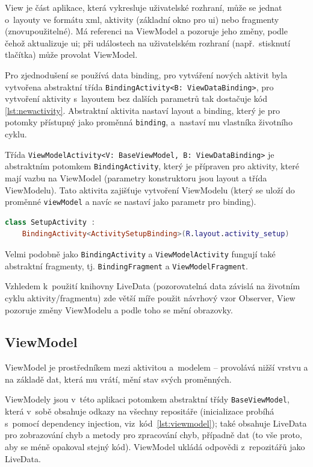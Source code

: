 \documentclass[twoside]{ctuthesis}
\begin{document}
View je část aplikace, která vykresluje uživatelské rozhraní, může se jednat o~layouty ve formátu \acrshort{xml}, aktivity (základní okno pro \acrshort{ui}) nebo fragmenty (znovupoužitelné). Má referenci na ViewModel a pozoruje jeho změny, podle čehož aktualizuje \acrshort{ui}; při událostech na uživatelském rozhraní (např.~stisknutí tlačítka) může provolat ViewModel.

Pro zjednodušení se používá data binding, pro vytváření nových aktivit byla vytvořena abstraktní třída \texttt{BindingActivity<B: ViewDataBinding>}, pro vytvoření aktivity s~layoutem bez dalších parametrů tak dostačuje kód \ref{lst:newactivity}. Abstraktní aktivita nastaví layout a binding, který je pro potomky přístupný jako proměnná \texttt{binding}, a~nastaví mu vlastníka životního cyklu.

Třída \texttt{ViewModelActivity<V: BaseViewModel, B:  ViewDataBinding>} je abstraktním potomkem \texttt{BindingActivity}, který je přípraven pro aktivity, které mají vazbu na ViewModel (parametry konstruktoru jsou layout a třída ViewModelu). Tato aktivita zajišťuje vytvoření ViewModelu (který se uloží do proměnné \texttt{viewModel} a navíc se nastaví jako parametr pro binding).

\begin{lstlisting}[language=Kotlin,caption={Vytvoření jednoduché aktivity},label={lst:newactivity}]
class SetupActivity :
	BindingActivity<ActivitySetupBinding>(R.layout.activity_setup)
\end{lstlisting}

Velmi podobně jako \texttt{BindingActivity} a \texttt{ViewModelActivity} fungují také abstraktní fragmenty, tj. \texttt{BindingFragment} a \texttt{ViewModelFragment}.

Vzhledem k~použití knihovny LiveData (pozorovatelná data závislá na životním cyklu aktivity/fragmentu) zde větší míře použit návrhový vzor Observer, View pozoruje změny ViewModelu a podle toho se mění obrazovky.

\subsection{ViewModel}

ViewModel je prostředníkem mezi aktivitou a~modelem -- provolává nižší vrstvu a na základě dat, která mu vrátí, mění stav svých proměnných.

ViewModely jsou v~této aplikaci potomkem abstraktní třídy \texttt{BaseViewModel}, která v~sobě obsahuje odkazy na všechny repositáře (inicializace probíhá s~pomocí dependency injection, viz~kód~\ref{lst:viewmodel}); také obsahuje LiveData pro zobrazování chyb a metody pro zpracování chyb, případně dat (to vše proto, aby se méně opakoval stejný kód). ViewModel ukládá odpovědi z~repozitářů jako LiveData.
\end{document}
